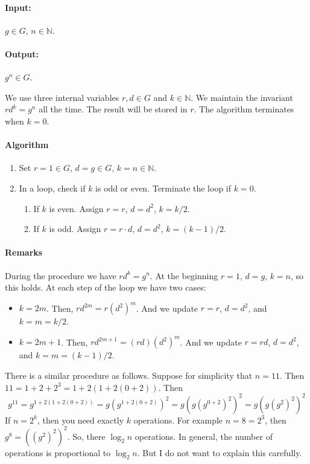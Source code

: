 \paragraph{Input:} $g\in G$, $n\in \mathbb N$.
\paragraph{Output:}  $g^n\in G$.

We use three internal variables $r, d\in G$ and $k\in \mathbb N$. We maintain the invariant $r d^k = g^n$ all the time. The result will be stored in $r$. The algorithm terminates when $k = 0$.
\paragraph{Algorithm}
\begin{enumerate}
\item Set $r = 1\in G$, $d = g \in G$, $k = n\in \mathbb N$.

\item In a loop, check if $k$ is odd or even. Terminate the loop if $k = 0$.
\begin{enumerate}
\item If $k$ is even. Assign $r = r$, $d = d^2$, $k = k / 2$.
\item If $k$ is odd. Assign $r = r \cdot d$, $d = d^2$, $k = (k-1) / 2$.
\end{enumerate}
\end{enumerate}
\paragraph{Remarks}
During the procedure we have $r d^k = g^n$. At the beginning $r = 1$, $d = g$, $k = n$, so this holds. At each step of the loop we have two cases:
\begin{itemize}
\item $k = 2m$. Then, $r d^{2m} = r (d^2)^m$. And we update $r = r$, $d = d^2$, and $k = m = k/2$.
\item $k = 2m +1$. Then, $r d^{2 m + 1} = (r d) (d^2)^m$. And we update $r = rd$, $d = d^2$, and $k = m = (k - 1) / 2$.
\end{itemize}
There is a similar procedure as follows. Suppose for simplicity that $n = 11$. Then $11 = 1 + 2 + 2^3 = 1 + 2 ( 1 + 2( 0 + 2 ))$. Then
\[
g^{11} = g^{1 + 2 ( 1 + 2( 0 + 2 ))} = g (g^{ 1 + 2( 0 + 2 )})^2 =  g (g (g^{ 0 + 2 })^2)^2 =   g (g (g^{ 2 })^2)^2
\]
If $n = 2^k$, then you need exactly $k$ operations. For example $n = 8 = 2^3$, then $g^8 = ((g^2)^2)^2$. So, there $\log_2 n$  operations. In general, the number of operations is proportional to $\log_2 n$. But I do not want to explain this carefully.

